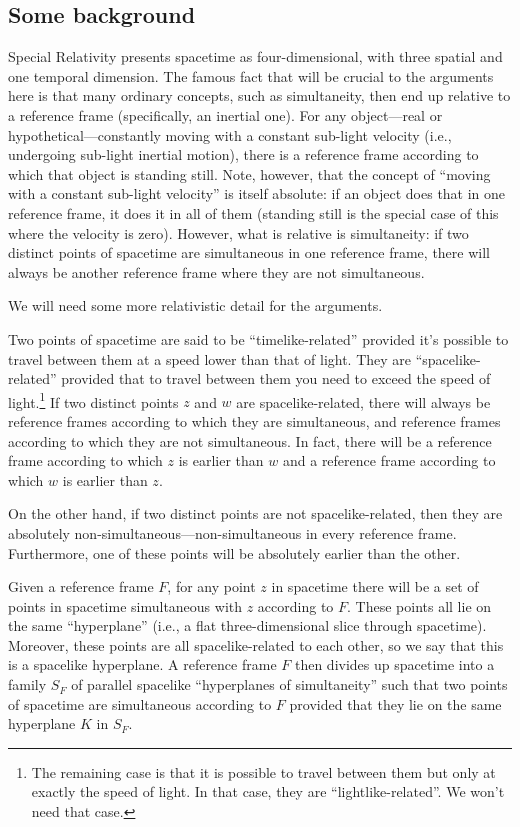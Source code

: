\subsection{Some background}
Special Relativity presents spacetime as four-dimensional, with three spatial and one temporal dimension.
The famous fact that will be crucial to the arguments here is that many ordinary concepts, such as simultaneity,
then end up relative to a reference frame (specifically, an inertial one). For any object---real or hypothetical---constantly 
moving with a constant sub-light velocity (i.e., undergoing sub-light inertial motion), there is a reference frame according 
to which that object 
is standing still. Note, however, that the concept of ``moving with a constant sub-light velocity'' is itself absolute: 
if an object does that in one reference frame, it does it in all of them (standing still is the special case of this where
the velocity is zero). However, what is relative is simultaneity: if two distinct points of spacetime are simultaneous in one 
reference frame, there will always be another reference frame where they are not simultaneous. 

We will need some more relativistic detail for the arguments. 

Two points of spacetime are said to be ``timelike-related'' provided it's possible to travel between them 
at a speed lower than that of light. They are ``spacelike-related'' provided that to travel between them 
you need to exceed the speed of light.\footnote{The remaining case is that it is possible to travel between 
them but only at exactly the speed of light. In that case, they are ``lightlike-related''. We won't need that 
case.} If two distinct points $z$ and $w$ are spacelike-related, there will always be reference frames according to which they are 
simultaneous, and reference frames according to which they are not simultaneous. In fact, there will be a reference frame
according to which $z$ is earlier than $w$ and a reference frame according to which $w$ is earlier than $z$. 

On the other hand, if two distinct points are not spacelike-related, then they are absolutely non-simultaneous---non-simultaneous 
in every reference frame. Furthermore, one of these points will be absolutely earlier than the other.

Given a reference frame $F$, for any point $z$ in spacetime there will be a set of points in spacetime simultaneous 
with $z$ according to $F$. These points all lie on the same ``hyperplane'' (i.e., a flat three-dimensional slice 
through spacetime). Moreover, these points are all spacelike-related to each other, so we say that this is a 
spacelike hyperplane. A reference frame $F$ then divides up spacetime into a family $S_F$ of parallel spacelike 
``hyperplanes of simultaneity'' such that two points of spacetime are simultaneous according to $F$ provided that they lie on the 
same hyperplane $K$ in $S_F$. 

